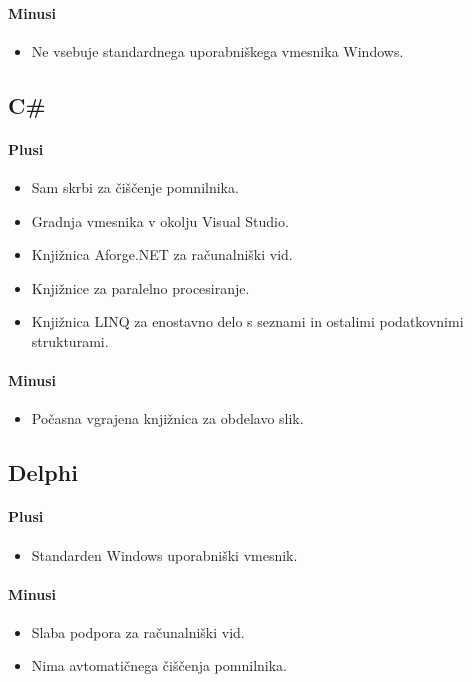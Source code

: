 \documentclass[oneside, a4paper, 12pt]{book}
\begin{document}
\paragraph{Minusi}
\begin{itemize}
\item Ne vsebuje standardnega uporabniškega vmesnika Windows.
\end{itemize}

\subsection{C\#}
\paragraph{Plusi}
\begin{itemize}
\item Sam skrbi za čiščenje pomnilnika.
\item Gradnja vmesnika v okolju Visual Studio.
\item Knjižnica Aforge.NET za računalniški vid.
\item Knjižnice za paralelno procesiranje.
\item Knjižnica LINQ za enostavno delo s seznami in ostalimi podatkovnimi 
strukturami.
\end{itemize}
\paragraph{Minusi}
\begin{itemize}
\item Počasna vgrajena knjižnica za obdelavo slik.
\end{itemize}


\subsection{Delphi}
\paragraph{Plusi}
\begin{itemize}
\item Standarden Windows uporabniški vmesnik.
\end{itemize}
\paragraph{Minusi}
\begin{itemize}
\item Slaba podpora za računalniški vid.
\item Nima avtomatičnega čiščenja pomnilnika.
\end{itemize}
\end{document}
